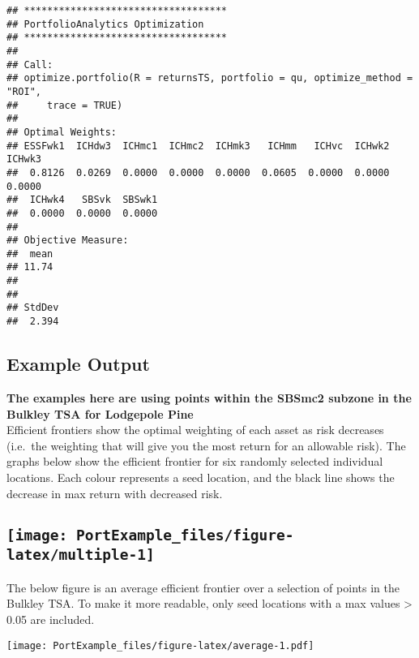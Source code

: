 \documentclass[]{article}
\begin{document}
\begin{verbatim}
## ***********************************
## PortfolioAnalytics Optimization
## ***********************************
## 
## Call:
## optimize.portfolio(R = returnsTS, portfolio = qu, optimize_method = "ROI", 
##     trace = TRUE)
## 
## Optimal Weights:
## ESSFwk1  ICHdw3  ICHmc1  ICHmc2  ICHmk3   ICHmm   ICHvc  ICHwk2  ICHwk3 
##  0.8126  0.0269  0.0000  0.0000  0.0000  0.0605  0.0000  0.0000  0.0000 
##  ICHwk4   SBSvk  SBSwk1 
##  0.0000  0.0000  0.0000 
## 
## Objective Measure:
##  mean 
## 11.74 
## 
## 
## StdDev 
##  2.394
\end{verbatim}

\subsection{Example Output}\label{example-output}

\textbf{The examples here are using points within the SBSmc2 subzone in
the Bulkley TSA for Lodgepole Pine}\\
Efficient frontiers show the optimal weighting of each asset as risk
decreases (i.e.~the weighting that will give you the most return for an
allowable risk). The graphs below show the efficient frontier for six
randomly selected individual locations. Each colour represents a seed
location, and the black line shows the decrease in max return with
decreased risk.

\subsection{\texorpdfstring{\texttt{[image: PortExample\_files/figure-latex/multiple-1]}}{}}\label{section-3}

The below figure is an average efficient frontier over a selection of
points in the Bulkley TSA. To make it more readable, only seed locations
with a max values \textgreater{} 0.05 are included.

\texttt{[image: PortExample\_files/figure-latex/average-1.pdf]}
\end{document}
